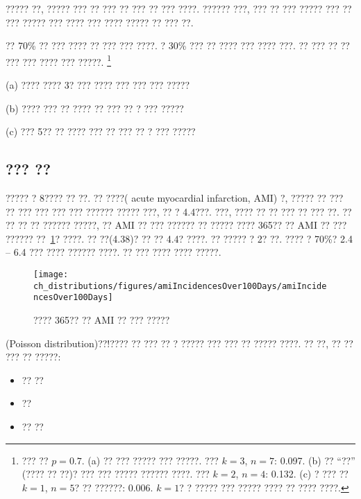 \begin{tipBox}{
????? ??, ????? ??? ?? ??? ?? ??? ?? ??? ????. ?????? ???, ??? ?? ??? ????? ??? ?? ??? ????? ??? ???? ??? ???? ????? ?? ??? ??.}
\end{tipBox}

\begin{exercise}
 ?? 70\% ?? ??? ???? ?? ??? ???  ????. ? 30\% ??? ?? ???? ??? ???? ???. ?? ??? ?? ?? ??? ??? ???? ??? ?????.
 \footnote{??? ?? $p=0.7$. 
 (a) ?? ??? ????? ??? ?????. ??? $k=3$, $n=7$: 0.097. (b) ?? ``??'' (???? ?? ??)? ??? ??? ????? ?????? ????. ??? $k=2$, $n=4$: 0.132. 
 (c) ? ??? ?? $k=1$, $n=5$? ?? ??????: 0.006. $k=1$? ? ????? ??? ????? ???? ?? ???? ????.}

(a) ???? ???? 3? ??? ???? ??? ??? ??? ?????

(b) ???? ??? ?? ???? ?? ??? ?? ? ??? ?????

(c) ??? 5?? ?? ???? ??? ?? ??? ?? ? ??? ?????
\end{exercise}


\textC{\pagebreak}


\subsection{??? ??}
\label{poisson}


\begin{example}{
????? ? 8???? ?? ??. ?? ????( acute myocardial infarction, AMI) ?, ????? ?? ??? ?? ??? ??? ??? ??? ?????? ????? ???, ?? ? 4.4???. ???, ???? ?? ?? ??? ?? ??? ??. ?? ?? ?? ?? ?????? ?????, ?? AMI ?? ??? ?????? ?? ?????} \label{amiIncidencesEachDayOver1YearInNYCExample}
???? 365?? ?? AMI ?? ??? ?????? ??~\ref{amiIncidencesOver100Days}? ????. ?? ??(4.38)? ?? ?? 4.4? ????. ?? ????? ? 2? ??. ???? ? 70\%? 2.4 -- 6.4 ??? ???? ?????? ????. ?? ??? ???? ???? ?????.
\end{example}

\begin{figure}[h]
\centering
\texttt{[image: ch\_distributions/figures/amiIncidencesOver100Days/amiIncidencesOver100Days]}
\caption{???? 365?? ?? AMI ?? ??? ?????}
\label{amiIncidencesOver100Days}
\end{figure}

(Poisson distribution){??!???}? ?? ??? ?? ? ????? ??? ??? ?? ????? ????. ?? ??, ?? ?? ??? ?? ?????:
\begin{itemize}
\setlength{\itemsep}{0mm}
\item ?? ??
\item ??
\item ?? ??
\end{itemize}

